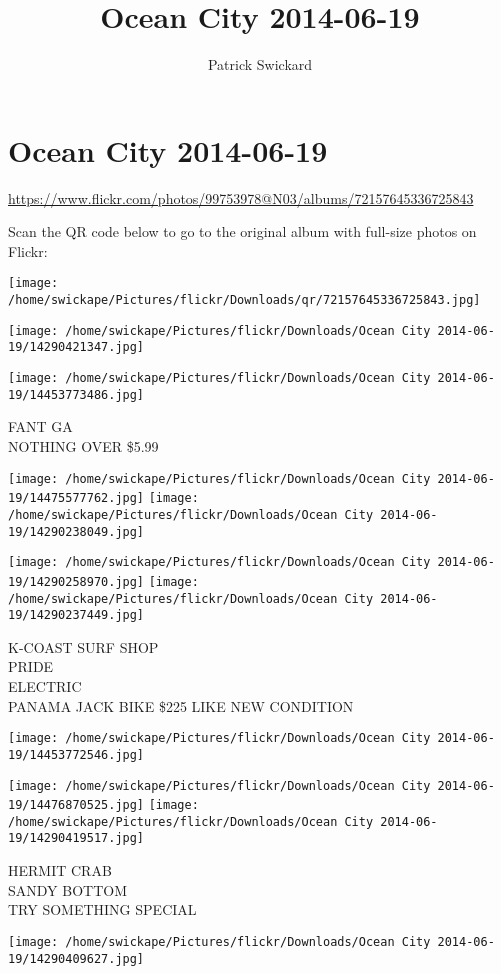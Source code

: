 \documentclass[10pt,letterpaper]{article}
\title{Ocean City 2014-06-19}
\author{Patrick Swickard}
\date{}
\begin{document}
\section*{Ocean City 2014-06-19}

\url{https://www.flickr.com/photos/99753978@N03/albums/72157645336725843}

Scan the QR code below to go to the original album with full-size photos on Flickr:

\texttt{[image: /home/swickape/Pictures/flickr/Downloads/qr/72157645336725843.jpg]}
\pagebreak

\texttt{[image: /home/swickape/Pictures/flickr/Downloads/Ocean City 2014-06-19/14290421347.jpg]}

\vspace{0.25in}
\texttt{[image: /home/swickape/Pictures/flickr/Downloads/Ocean City 2014-06-19/14453773486.jpg]}

FANT GA\\
NOTHING OVER \$5.99
\pagebreak

\texttt{[image: /home/swickape/Pictures/flickr/Downloads/Ocean City 2014-06-19/14475577762.jpg]}
\texttt{[image: /home/swickape/Pictures/flickr/Downloads/Ocean City 2014-06-19/14290238049.jpg]}

\texttt{[image: /home/swickape/Pictures/flickr/Downloads/Ocean City 2014-06-19/14290258970.jpg]}
\texttt{[image: /home/swickape/Pictures/flickr/Downloads/Ocean City 2014-06-19/14290237449.jpg]}

K{-}COAST SURF SHOP\\
PRIDE\\
ELECTRIC\\
PANAMA JACK BIKE \$225 LIKE NEW CONDITION
\pagebreak

\texttt{[image: /home/swickape/Pictures/flickr/Downloads/Ocean City 2014-06-19/14453772546.jpg]}

\vspace{0.25in}
\texttt{[image: /home/swickape/Pictures/flickr/Downloads/Ocean City 2014-06-19/14476870525.jpg]}
\texttt{[image: /home/swickape/Pictures/flickr/Downloads/Ocean City 2014-06-19/14290419517.jpg]}

HERMIT CRAB\\
SANDY BOTTOM\\
TRY SOMETHING SPECIAL
\pagebreak

\texttt{[image: /home/swickape/Pictures/flickr/Downloads/Ocean City 2014-06-19/14290409627.jpg]}
\end{document}
